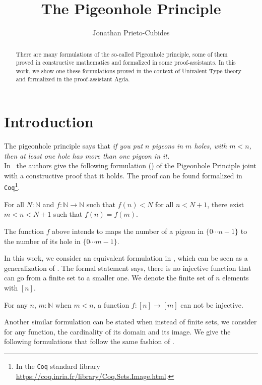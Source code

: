 \documentclass[11pt, a4paper, oneside]{amsart}
\title{The Pigeonhole Principle}
\author{Jonathan Prieto-Cubides}
\begin{document}
\maketitle

\begin{abstract}
There are many formulations of the so-called Pigeonhole principle,
some of them proved in constructive mathematics and formalized
in some proof-assistants. In this work, we show one these formulations
proved in the context of Univalent Type theory and
formalized in the proof-assistant Agda.
\end{abstract}

\section{Introduction}

The pigeonhole principle says that \emph{if you put $n$ pigeons in
$m$ holes, with $m < n$, then at least one hole has more
than one pigeon in it.
}\\

In~\cite{symmetrybook} the authors give the following formulation
() of the Pigeonhole Principle joint with a constructive proof
that it holds. The proof can be found formalized in \texttt{Coq}\footnote{In
the \texttt{Coq} standard library
\url{https://coq.inria.fr/library/Coq.Sets.Image.html}.}.

\begin{theorem}\label{lem:PHP}
For all $N:ℕ$ and $f:ℕ\to ℕ$ such that $f(n)<N$
for all $n<N+1$, there exist $m < n < N+1$ such that $f(n)=f(m)$.
\end{theorem}
The function $f$ above intends to maps the number of a pigeon in $\{0\cdots n−1\}$ to
the number of its hole in $\{0\cdots m−1\}$.

In this work, we consider an equivalent formulation in ,
which can be seen as a generalization of . The formal statement
says, there is no injective function that can go from a finite set to a smaller
one. We denote the finite set of $n$ elements with $[n]$.

\begin{theorem}\label{pigeon-theorem}
For any $n,\, m : ℕ$ when $m < n$,  a function $f : [ n ] \to [ m ]$
can not be injective.
\end{theorem}

Another similar formulation can be stated when instead of finite sets, we
consider for any function, the cardinality of its domain and its image. We
give the following formulations that follow the same fashion of
.
\end{document}
